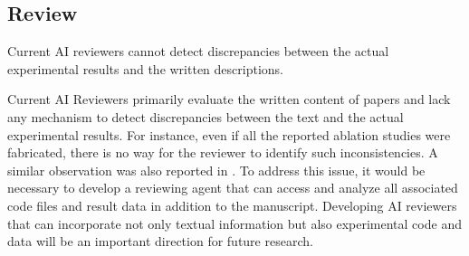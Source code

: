\subsection{Review}
\begin{tcolorbox}[colback=gray!10, colframe=gray!40!black, title=Review Risk1 :,breakable]
     Current AI reviewers cannot detect discrepancies between the actual experimental results and the written descriptions.
\end{tcolorbox}

Current AI Reviewers primarily evaluate the written content of papers and lack any mechanism to detect discrepancies between the text and the actual experimental results.
For instance, even if all the reported ablation studies were fabricated, there is no way for the reviewer to identify such inconsistencies. A similar observation was also reported in \citep{jiang2025badscientist}.
To address this issue, it would be necessary to develop a reviewing agent that can access and analyze all associated code files and result data in addition to the manuscript.
Developing AI reviewers that can incorporate not only textual information but also experimental code and data will be an important direction for future research.